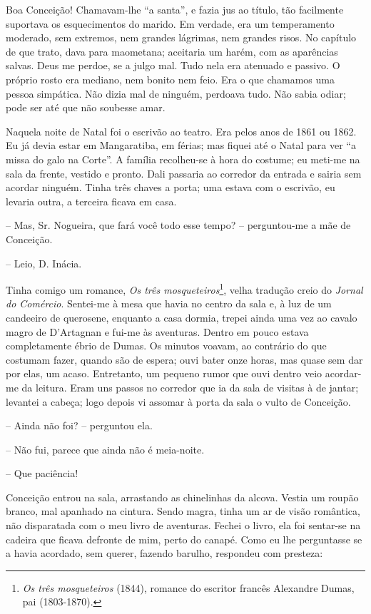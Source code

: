 Boa Conceição! Chamavam-lhe ``a santa'', e fazia jus ao título, tão
facilmente suportava os esquecimentos do marido. Em verdade, era um
temperamento moderado, sem extremos, nem grandes lágrimas, nem grandes
risos. No capítulo de que trato, dava para maometana; aceitaria um
harém, com as aparências salvas. Deus me perdoe, se a julgo mal. Tudo
nela era atenuado e passivo. O próprio rosto era mediano, nem bonito nem
feio. Era o que chamamos uma pessoa simpática. Não dizia mal de ninguém,
perdoava tudo. Não sabia odiar; pode ser até que não soubesse amar.

Naquela noite de Natal foi o escrivão ao teatro. Era pelos anos de 1861
ou 1862. Eu já devia estar em Mangaratiba, em férias; mas fiquei até o
Natal para ver ``a missa do galo na Corte''. A família recolheu-se à
hora do costume; eu meti-me na sala da frente, vestido e pronto. Dali
passaria ao corredor da entrada e sairia sem acordar ninguém. Tinha três
chaves a porta; uma estava com o escrivão, eu levaria outra, a terceira
ficava em casa.

-- Mas, Sr. Nogueira, que fará você todo esse tempo? -- perguntou-me a
mãe de Conceição.

-- Leio, D. Inácia.

Tinha comigo um romance, \emph{Os três mosqueteiros}\footnote{\emph{Os
  três mosqueteiros} (1844), romance do escritor francês Alexandre
  Dumas, pai (1803-1870).}, velha tradução creio do \emph{Jornal do
Comércio}. Sentei-me à mesa que havia no centro da sala e, à luz de um
candeeiro de querosene, enquanto a casa dormia, trepei ainda uma vez ao
cavalo magro de D'Artagnan e fui-me às aventuras. Dentro em pouco estava
completamente ébrio de Dumas. Os minutos voavam, ao contrário do que
costumam fazer, quando são de espera; ouvi bater onze horas, mas quase
sem dar por elas, um acaso. Entretanto, um pequeno rumor que ouvi dentro
veio acordar-me da leitura. Eram uns passos no corredor que ia da sala
de visitas à de jantar; levantei a cabeça; logo depois vi assomar à
porta da sala o vulto de Conceição.

-- Ainda não foi? -- perguntou ela.

-- Não fui, parece que ainda não é meia-noite.

-- Que paciência!

Conceição entrou na sala, arrastando as chinelinhas da alcova. Vestia um
roupão branco, mal apanhado na cintura. Sendo magra, tinha um ar de
visão romântica, não disparatada com o meu livro de aventuras. Fechei o
livro, ela foi sentar-se na cadeira que ficava defronte de mim, perto do
canapé. Como eu lhe perguntasse se a havia acordado, sem querer, fazendo
barulho, respondeu com presteza:

